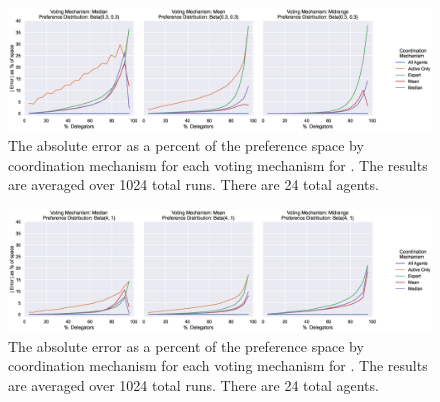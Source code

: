 \label{apx:error-by-dist-zoomed}
\begin{landscape}
    \begin{figure}[p]
        \centering
        \includegraphics[scale=0.55]
        {content/chapter2/figures/distributions/Beta_0.3_0.3_error_as_percent_of_space_abs_mean}
        \caption{
            The absolute error as a percent of the preference space by coordination
            mechanism for each voting mechanism for .
            The results are averaged over 1024 total runs.
            There are 24 total agents.
        }
        \label{fig:beta-.3-.3-error-as-percent-of-space-abs-mean}
    \end{figure}
\end{landscape}

\begin{landscape}
    \begin{figure}[p]
        \centering
        \includegraphics[scale=0.55]
        {content/chapter2/figures/distributions/Beta_4_1_error_as_percent_of_space_abs_mean}
        \caption{
            The absolute error as a percent of the preference space by coordination
            mechanism for each voting mechanism for .
            The results are averaged over 1024 total runs.
            There are 24 total agents.
        }
        \label{fig:beta-4-1-error-as-percent-of-space-abs-mean}
    \end{figure}
\end{landscape}

